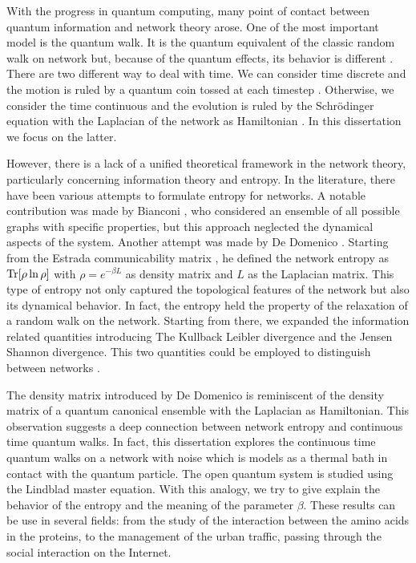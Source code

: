 With the progress in quantum computing, many point of contact between quantum information and network theory arose.
One of the most important model is the quantum walk. It is the quantum equivalent of the classic random walk on network but, because of the quantum effects, its behavior is different \cite{Kempe}. There are two different way to deal with time. We can consider time discrete and the motion is ruled by a quantum coin tossed at each timestep \cite{Coin_quantum_walk}. Otherwise, we consider the time continuous and the evolution is ruled by the Schrödinger equation with the Laplacian of the network as Hamiltonian \cite{Farhi_98}. In this dissertation we focus on the latter.

However, there is a lack of a unified theoretical framework in the network theory, particularly concerning information theory and entropy. 
In the literature, there have been various attempts to formulate entropy for networks. A notable contribution was made by Bianconi \cite{Bianconi_entropy_1,Bianconi_entropy_2}, who considered an ensemble of all possible graphs with specific properties, but this approach neglected the dynamical aspects of the system.
Another attempt was made by De Domenico \cite{De_Domenico_2016}. Starting from the Estrada communicability matrix \cite{Estrada_2008}, he defined the network entropy as $\operatorname{Tr}[\rho \ln \rho]$ with $\rho = e^{-\beta L}$ as density matrix and $L$ as the Laplacian matrix. This type of entropy not only captured the topological features of the network but also its dynamical behavior. In fact, the entropy held the property of the relaxation of a random walk on the network. Starting from there, we expanded the information related quantities introducing The Kullback Leibler divergence and the Jensen Shannon divergence. This two quantities could be employed to distinguish between networks \cite{multilayer}.

The density matrix introduced by De Domenico is reminiscent of the density matrix of a quantum canonical ensemble with the Laplacian as Hamiltonian. This observation suggests a deep connection between network entropy and continuous time quantum walks. 
In fact, this dissertation explores the continuous time quantum walks on a network with noise which is models as a thermal bath in contact with the quantum particle. The open quantum system is studied using the Lindblad master equation.
With this analogy, we try to give explain the behavior of the entropy and the meaning of the parameter $\beta$.
These results can be use in several fields: from the study of the interaction between the amino acids in the proteins, to the management of the urban traffic, passing through the social interaction on the Internet.

